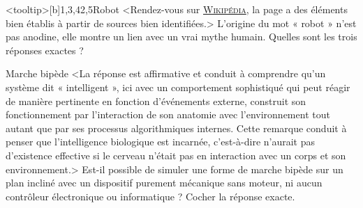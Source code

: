 \begin{quiz}[title={Robotique et intelligence artificielle}]
\begin{quizquestion}<tooltip>[b]{1,3,4}{2,5}{Robot}
<Rendez-vous sur \href{https://fr.wikipedia.org/wiki/Robot}{\textsc{Wikipédia}}, la page a des éléments bien établis à partir de sources bien identifiées.>
L'origine du mot « robot » n'est pas anodine, elle montre un lien avec un vrai mythe humain.
Quelles sont les trois réponses exactes ?
\end{quizquestion}

\begin{quizquestion*}[b]{2}{1}{Marche bipède}
<La réponse est affirmative et conduit à comprendre qu'un système dit « intelligent », ici avec un comportement sophistiqué qui peut réagir de manière pertinente en fonction d'événements externe, construit son fonctionnement par l'interaction de son anatomie avec l'environnement tout autant que par ses processus algorithmiques internes.
Cette remarque conduit à penser que l'intelligence biologique est incarnée, c'est-à-dire n'aurait pas d'existence effective si le cerveau n'était pas en interaction avec un corps et son environnement.>
Est-il possible de simuler une forme de marche bipède sur un plan incliné avec un dispositif purement mécanique sans moteur, ni aucun contrôleur électronique ou informatique ?
Cocher la réponse exacte.
\end{quizquestion*}


\end{quiz}

